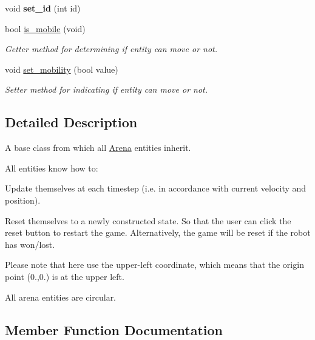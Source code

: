 \begin{DoxyCompactItemize}
void {\bfseries set\+\_\+id} (int id)
\item 
\mbox{\label{class_arena_entity_a9cfea21220c07502abd084afde49ae65}} 
bool \mbox{\hyperlink{class_arena_entity_a9cfea21220c07502abd084afde49ae65}{is\+\_\+mobile}} (void)
\begin{DoxyCompactList}\small\item\em Getter method for determining if entity can move or not. \end{DoxyCompactList}\item 
\mbox{\label{class_arena_entity_adb5d3089fec5c28cc989e5834fcdaf6c}} 
void \mbox{\hyperlink{class_arena_entity_adb5d3089fec5c28cc989e5834fcdaf6c}{set\+\_\+mobility}} (bool value)
\begin{DoxyCompactList}\small\item\em Setter method for indicating if entity can move or not. \end{DoxyCompactList}\end{DoxyCompactItemize}


\subsection{Detailed Description}
A base class from which all \mbox{\hyperlink{class_arena}{Arena}} entities inherit. 

All entities know how to\+:


\begin{DoxyEnumerate}
\item Update themselves at each timestep (i.\+e. in accordance with current velocity and position).
\item Reset themselves to a newly constructed state. So that the user can click the reset button to restart the game. Alternatively, the game will be reset if the robot has won/lost.
\end{DoxyEnumerate}

Please note that here use the upper-\/left coordinate, which means that the origin point (0.,0.) is at the upper left.

All arena entities are circular. 

\subsection{Member Function Documentation}
\mbox{\label{class_arena_entity_ad43152003033cf01ad86eeff1990b69a}} 
